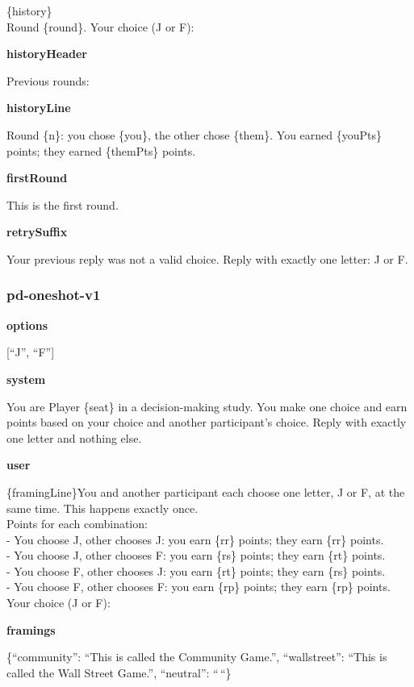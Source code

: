 \documentclass[11pt]{article}
\begin{document}
\{history\}\\

Round \{round\}. Your choice (J or F):

\textbf{historyHeader}

Previous rounds:

\textbf{historyLine}

Round \{n\}: you chose \{you\}, the other chose \{them\}. You earned
\{youPts\} points; they earned \{themPts\} points.

\textbf{firstRound}

This is the first round.

\textbf{retrySuffix}

Your previous reply was not a valid choice. Reply with exactly one
letter: J or F.

\subsubsection{pd-oneshot-v1}\label{pd-oneshot-v1}

\textbf{options}

{[}``J'', ``F''{]}

\textbf{system}

You are Player \{seat\} in a decision-making study. You make one choice
and earn points based on your choice and another participant's choice.
Reply with exactly one letter and nothing else.

\textbf{user}

\{framingLine\}You and another participant each choose one letter, J or
F, at the same time. This happens exactly once.\\
Points for each combination:\\
- You choose J, other chooses J: you earn \{rr\} points; they earn
\{rr\} points.\\
- You choose J, other chooses F: you earn \{rs\} points; they earn
\{rt\} points.\\
- You choose F, other chooses J: you earn \{rt\} points; they earn
\{rs\} points.\\
- You choose F, other chooses F: you earn \{rp\} points; they earn
\{rp\} points.\\

Your choice (J or F):

\textbf{framings}

\{``community'': ``This is called the Community Game.'', ``wallstreet'':
``This is called the Wall Street Game.'', ``neutral'': ``\,``\}
\end{document}
